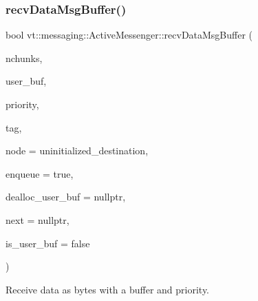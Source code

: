 \subsubsection{\texorpdfstring{recv\+Data\+Msg\+Buffer()}{recvDataMsgBuffer()}\hspace{0.1cm}{\footnotesize\ttfamily [1/2]}}
{\footnotesize\ttfamily bool vt\+::messaging\+::\+Active\+Messenger\+::recv\+Data\+Msg\+Buffer (\begin{DoxyParamCaption}\item[{int}]{nchunks,  }\item[{void $\ast$const}]{user\+\_\+buf,  }\item[{\hyperlink{namespacevt_a86bff9f556eb761b27fc8600d006ac04}{Priority\+Type}}]{priority,  }\item[{\hyperlink{namespacevt_a84ab281dae04a52a4b243d6bf62d0e52}{Tag\+Type} const \&}]{tag,  }\item[{\hyperlink{namespacevt_a866da9d0efc19c0a1ce79e9e492f47e2}{Node\+Type} const \&}]{node = {\ttfamily uninitialized\+\_\+destination},  }\item[{bool const \&}]{enqueue = {\ttfamily true},  }\item[{\hyperlink{namespacevt_ae0a5a7b18cc99d7b732cb4d44f46b0f3}{Action\+Type}}]{dealloc\+\_\+user\+\_\+buf = {\ttfamily nullptr},  }\item[{\hyperlink{namespacevt_a6de3bd201e2a040be9362d9d24d1e446}{Continuation\+Deleter\+Type}}]{next = {\ttfamily nullptr},  }\item[{bool}]{is\+\_\+user\+\_\+buf = {\ttfamily false} }\end{DoxyParamCaption})}



Receive data as bytes with a buffer and priority. 


